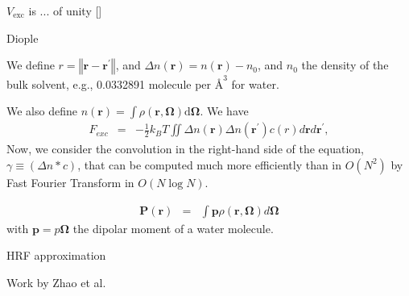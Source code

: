 $V_{\mathrm{exc}}$ is ... of unity {[}{]}

Diople

We define $r=\left\Vert \bm{r}-\bm{r}^{\prime}\right\Vert $, and
$\Delta n\left(\bm{r}\right)=n\left(\bm{r}\right)-n_{0}$, and $n_{0}$
the density of the bulk solvent, e.g., 0.0332891 molecule per $\textrm{\AA}^{3}$
for water.

We also define $n\left(\bm{r}\right)=\int\rho(\bm{r},\boldsymbol{\Omega})\mbox{d}\boldsymbol{\Omega}$.
We have 
\begin{eqnarray}
F_{exc} & = & -\frac{1}{2}k_{B}T\iint\Delta n\left(\boldsymbol{r}\right)\Delta n\left(\boldsymbol{r}^{\prime}\right)c\left(r\right)d\bm{r}d\bm{r}^{\prime},
\end{eqnarray}
Now, we consider the convolution in the right-hand side of the equation,
$\gamma\equiv\left(\Delta n*c\right)$, that can be computed much more
efficiently than in $O\left(N^{2}\right)$ by Fast Fourier Transform
in $O\left(N\log N\right)$.

\begin{eqnarray}
\bm{P}\left(\bm{r}\right) & = & \int\bm{p}\rho\left(\bm{r},\bm{\Omega}\right)d\bm{\Omega}
\end{eqnarray}
with $\bm{p}=p\bm{\Omega}$ the dipolar moment of a water molecule.

HRF approximation \citep{Zhao_2011}

Work by Zhao et al.

